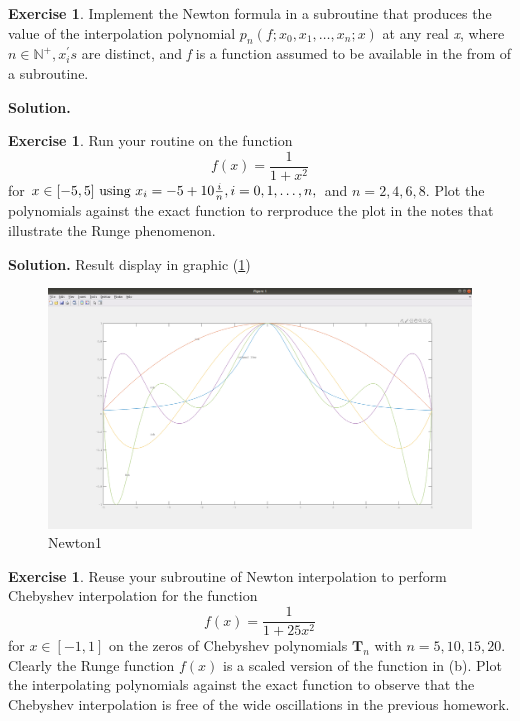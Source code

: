 \documentclass[a4paper]{book}
\newenvironment{solution}%
{\noindent\textbf{Solution.}}%
{\qedhere}
\numberwithin{equation}{chapter}
\theoremstyle{definition}
\newtheorem{exc}[exm]{Exercise}
\begin{document}
\begin{exc}
  Implement the Newton formula in a subroutine that produces the value of the interpolation polynomial $p_n(f;x_0, x_1, \dots, x_n; x)$ at any real \textit{x}, where $ n \in \mathbb{N}^+, x^{\prime}_{i}s $ are distinct, and \textit{f} is a function assumed to be available in the from of a subroutine.
\end{exc}

\begin{solution}
  
\end{solution}

\begin{exc}
  Run your routine on the function
  \[ f(x) = \frac{1}{1+x^2}\]
  for $x \in [-5,5] \textmd{ using } x_i = -5 + 10\frac{i}{n}, i = 0,1,\dots, n, $ and $ n = 2, 4, 6,8. $ Plot the polynomials against the exact function to rerproduce the plot in the notes that illustrate the Runge phenomenon. 
\end{exc}

\begin{solution}
  Result display in graphic (\ref{fig:1})
  \begin{figure}[]
    \centering
    \includegraphics*[scale = 0.25]{code/Data/b}
    \caption{Newton1}\label{fig:1}
  \end{figure}
\end{solution}

\begin{exc}
  Reuse your subroutine of Newton interpolation to perform Chebyshev interpolation for the function
  \[ f(x) = \frac{1}{1 + 25x^2}\]
  for $x \in [-1,1]$ on the zeros of Chebyshev polynomials $\mathbf{T}_n$ with $n = 5, 10, 15,20. $ Clearly the Runge function $f(x)$ is a scaled version of the function in (b). Plot the interpolating polynomials against the exact function to observe that the Chebyshev interpolation is free of the wide oscillations in the previous homework.
\end{exc}
\end{document}
